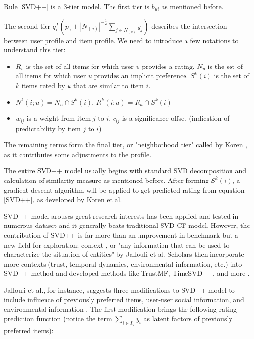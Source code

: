 \documentclass[letter paper, 11pt]{article}
\begin{document}
	
	Rule \ref{SVD++} is a 3-tier model. The first tier is $b_{ui}$ as mentioned before. 
	
	
	The second tier $q_i^T  (p_u + |N_{(u)}|^{-\frac{1}{2}} \sum_{j \in N_{(u)}}y_j)$ describes the intersection between user profile and item profile. We need to introduce a few notations to understand this tier:
	\begin{itemize}
		\item $R_u$ is the set of all items for which user $u$ provides a rating. $N_u$ is the set of all items for which user $u$ provides an implicit preference. $S^k(i)$ is the set of $k$ items rated by $u$ that are similar to item $i$.
		
		\item $N^k{(i; u)} = N_u \cap S^k (i)$. $R^k{(i; u)} = R_u \cap S^k (i)$
		
		\item $w_{ij}$ is a weight from item $j$ to $i$. $c_{ij}$ is a significance offset (indication of predictability by item $j$ to $i$)
	\end{itemize}
	
	The remaining terms form the final tier, or "neighborhood tier" called by Koren \cite{korenFactorization}, as it contributes some adjustments to the profile.
	
	The entire SVD++ model usually begins with standard SVD decomposition and calculation of similarity measure as mentioned before. After forming $S^k(i)$, a gradient descent algorithm will be applied to get predicted rating from equation \ref{SVD++}, as developed by Koren et al\cite{koren2010}.  
	
	SVD++ model arouses great research interests has been applied and tested in numerous dataset \cite{SVD++performance} \cite{korenFactorization} and it generally beats traditional SVD-CF model. However, the contribution of SVD++ is far more than an improvement in benchmark but a new field for exploration: context \cite{contextual}, or "any information that can be used to characterize the situation of entities" by Jallouli et al. Scholars then incorporate more contexts (trust, temporal dynamics, environmental information, etc.) into SVD++ method and developed methods like TrustMF, TimeSVD++, and more \cite{contextual} \cite{review}.
	
			
	Jallouli et al., for instance, suggests three modifications to SVD++ model to include influence of previously preferred items, user-user social information, and environmental information \cite{contextual}. The first modification brings the following rating prediction function (notice the term $\sum_{i \in I_u} y_i$ as latent factors of previously preferred items):
	
\end{document}
